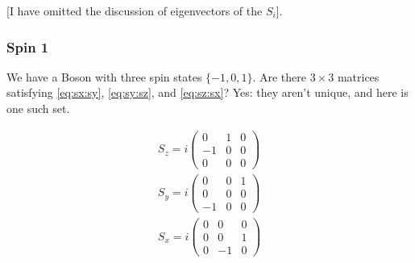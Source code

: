 \documentclass[]{article}
\begin{document}
[I have omitted the discussion of eigenvectors of the $S_i$].

\subsubsection{Spin 1}

We have  a Boson with three spin states $\{-1,0,1\}$. Are there $3\times3$ matrices satisfying \eqref{eq:sx:sy}, \eqref{eq:sy:sz}, and \eqref{eq:sz:sx}? Yes: they aren't unique, and here is one such set.

\begin{align*}
	S_z = i \begin{pmatrix}
		0&1&0\\
		-1&0&0\\
		0&0&0
	\end{pmatrix}\\
	S_y = i \begin{pmatrix}
		0&0&1\\
		0&0&0\\
		-1&0&0
	\end{pmatrix}\\
	S_x = i \begin{pmatrix}
		0&0&0\\
		0&0&1\\
		0&-1&0
	\end{pmatrix}
\end{align*}
\end{document}
